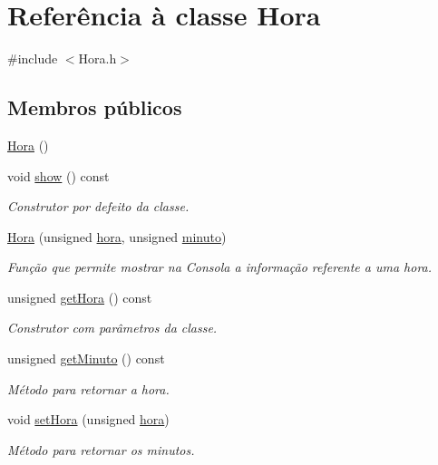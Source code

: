 \hypertarget{class_hora}{\section{Referência à classe Hora}
\label{class_hora}
}


{\ttfamily \#include $<$Hora.\+h$>$}

\subsection*{Membros públicos}
\begin{DoxyCompactItemize}
\item 
\hyperlink{class_hora_a90c18369977bbf1bf3a7370d8ea9e9ae}{Hora} ()
\item 
void \hyperlink{class_hora_a22a4cc9c0bd37db37040680d9e772221}{show} () const 
\begin{DoxyCompactList}\small\item\em Construtor por defeito da classe. \end{DoxyCompactList}\item 
\hyperlink{class_hora_ac2b1f6c87010f4c8af8c3f1986c02b23}{Hora} (unsigned \hyperlink{class_hora_ab901e62ae1158965687dc736a45ee8fe}{hora}, unsigned \hyperlink{class_hora_a9d33ce2d8a3f4b3d05b2a3c6df782fa4}{minuto})
\begin{DoxyCompactList}\small\item\em Função que permite mostrar na Consola a informação referente a uma hora. \end{DoxyCompactList}\item 
unsigned \hyperlink{class_hora_ae55080cc8706bcbf135036edcc4112a5}{get\+Hora} () const 
\begin{DoxyCompactList}\small\item\em Construtor com parâmetros da classe. \end{DoxyCompactList}\item 
unsigned \hyperlink{class_hora_adccaf5d0c9e674462f77b31ae05bdb86}{get\+Minuto} () const 
\begin{DoxyCompactList}\small\item\em Método para retornar a hora. \end{DoxyCompactList}\item 
void \hyperlink{class_hora_afc47b74f8d5673565ebe3de1bbfb92a6}{set\+Hora} (unsigned \hyperlink{class_hora_ab901e62ae1158965687dc736a45ee8fe}{hora})
\begin{DoxyCompactList}\small\item\em Método para retornar os minutos. \end{DoxyCompactList}\item 

\end{DoxyCompactItemize}
